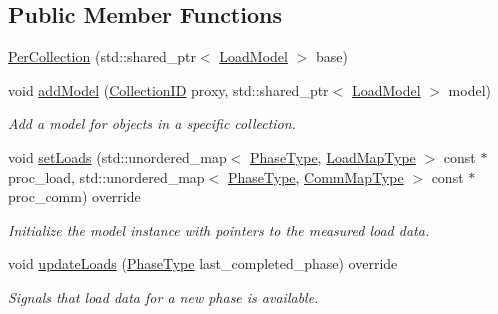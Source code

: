 \subsection*{Public Member Functions}
\begin{DoxyCompactItemize}
\item 
\hyperlink{structvt_1_1vrt_1_1collection_1_1balance_1_1_per_collection_aa149a252fec1619bd947e53e3a66b854}{Per\+Collection} (std\+::shared\+\_\+ptr$<$ \hyperlink{structvt_1_1vrt_1_1collection_1_1balance_1_1_load_model}{Load\+Model} $>$ base)
\item 
void \hyperlink{structvt_1_1vrt_1_1collection_1_1balance_1_1_per_collection_a79ecd769664dcaabe413a5d77033b81b}{add\+Model} (\hyperlink{structvt_1_1vrt_1_1collection_1_1balance_1_1_per_collection_ade08a6857f727a0a9d1ef63b25fc5b71}{Collection\+ID} proxy, std\+::shared\+\_\+ptr$<$ \hyperlink{structvt_1_1vrt_1_1collection_1_1balance_1_1_load_model}{Load\+Model} $>$ model)
\begin{DoxyCompactList}\small\item\em Add a model for objects in a specific collection. \end{DoxyCompactList}\item 
void \hyperlink{structvt_1_1vrt_1_1collection_1_1balance_1_1_per_collection_aba8f472fbe40c44c9f0f9028afe29cfc}{set\+Loads} (std\+::unordered\+\_\+map$<$ \hyperlink{namespacevt_a46ce6733d5cdbd735d561b7b4029f6d7}{Phase\+Type}, \hyperlink{namespacevt_1_1vrt_1_1collection_1_1balance_a5339303db2e1ce964d783a53fd74e6b1}{Load\+Map\+Type} $>$ const $\ast$proc\+\_\+load, std\+::unordered\+\_\+map$<$ \hyperlink{namespacevt_a46ce6733d5cdbd735d561b7b4029f6d7}{Phase\+Type}, \hyperlink{namespacevt_1_1vrt_1_1collection_1_1balance_a01ee1fb0ae2da1d2ab7fdca3be9ae351}{Comm\+Map\+Type} $>$ const $\ast$proc\+\_\+comm) override
\begin{DoxyCompactList}\small\item\em Initialize the model instance with pointers to the measured load data. \end{DoxyCompactList}\item 
void \hyperlink{structvt_1_1vrt_1_1collection_1_1balance_1_1_per_collection_a2b41fbbe2b684654f8dbfd9207b77501}{update\+Loads} (\hyperlink{namespacevt_a46ce6733d5cdbd735d561b7b4029f6d7}{Phase\+Type} last\+\_\+completed\+\_\+phase) override
\begin{DoxyCompactList}\small\item\em Signals that load data for a new phase is available. \end{DoxyCompactList}\item 

\end{DoxyCompactItemize}
